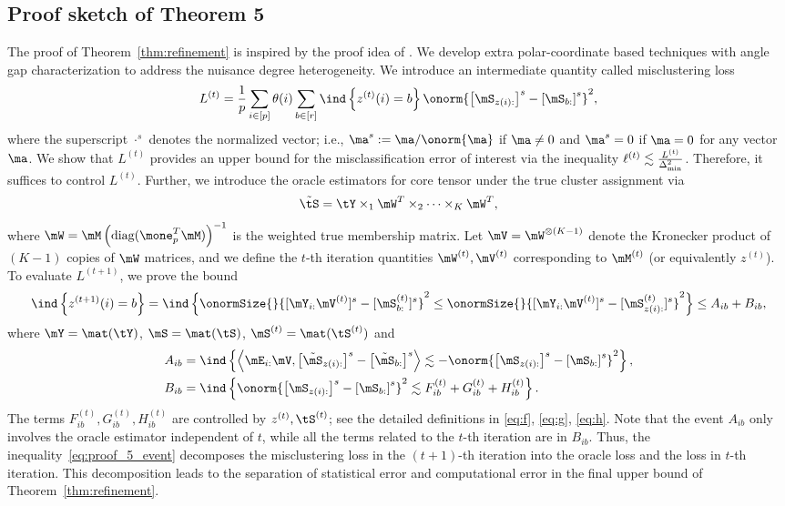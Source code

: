 \documentclass[lettersize,onecolumn,journal]{IEEEtran}
\theoremstyle{definition}
\theoremstyle{definition}
\newcommand{\of}[1]{\left(#1\right)}
\newcommand{\off}[1]{\left[#1\right]}
\newcommand{\offf}[1]{\left\{#1\right\}}
\newcommand{\ang}[1]{\left\langle#1\right\rangle}
\begin{document}
\subsection{Proof sketch of Theorem 5}
The proof of Theorem~\ref{thm:refinement} is inspired by the proof idea of \citet[Theorem 2]{han2020exact}. We develop extra polar-coordinate based techniques with angle gap characterization to address the nuisance degree heterogeneity. We introduce an intermediate quantity called misclustering loss
\begin{equation}
     L^{(t)} = \frac{1}{p}  \sum_{i \in [p]} \theta(i) \sum_{b \in [r]}  \ind \offf{ z^{(t)}(i) = b } \onorm{ \off{ \mS_{ z(i):}  }^s - \off{ \mS_{b:}  }^s  }^2,
\end{equation}
where the superscript $\cdot^{s}$ denotes the normalized vector; i.e., $\ma^s:=\ma/\onorm{\ma}$ if $\ma\neq 0$ and $\ma^{s}=0$ if $\ma=0$ for any vector $\ma$. We show that $L^{(t)}$ provides an upper bound for the misclassification error of interest via the inequality $\ell^{(t)}\lesssim {L^{(t)}\over \Delta^2_{\min}}$. Therefore, it suffices to control $L^{(t)}$. Further, we introduce the oracle estimators for core tensor under the true cluster assignment via 
\begin{equation}
    \tilde \tS = \tY \times_1 \mW^T \times_2 \cdots \times_K \mW^T, 
\end{equation}
where $\mW = \mM \of{ \text{diag}(\mone_{p}^T \mM) }^{-1}$ is the weighted true membership matrix. Let $ \mV = \mW^{\otimes (K-1)}$ denote the Kronecker product of $(K-1)$ copies of $\mW$ matrices, and we define the $t$-th iteration quantities $\mW^{(t)}, \mV^{(t)}$ corresponding to $\mM^{(t)}$ (or equivalently $z^{(t)}$). To evaluate $L^{(t+1)}$, we prove the bound
\begin{equation}\label{eq:proof_5_event}
    \ind \offf{ z^{(t+1)}(i) = b } = \ind \offf{       \onormSize{}{ [ \mY_{i:} \mV^{(t)}  ]^s - [\mS_{b:}^{(t)}]^s }^2 \leq \onormSize{}{ [ \mY_{i:} \mV^{(t)}  ]^s - [\mS_{z(i):}^{(t)}]^s }^2} \leq A_{ib} + B_{ib},
\end{equation}
where $\mY = \mat(\tY)$, $ \mS = \mat(\tS)$, $\mS^{(t)} = \mat(\tS^{(t)})$ and
\begin{align}
        A_{ib} &= \ind \offf{\ang{ \mE_{i:} \mV, \off{  \tilde \mS_{z(i):} }^s - \off{  \tilde \mS_{b:} }^s } \lesssim -  \onorm{ \off{ \mS_{z(i):}  }^s - \off{ \mS_{b:}  }^s  }^2 },\\
        B_{ib} &= \ind \offf{\onorm{ \off{ \mS_{z(i):}  }^s - \off{ \mS_{b:}  }^s  }^2 \lesssim F_{ib}^{(t)} + G_{ib}^{(t)} + H_{ib}^{(t)} }.
\end{align}
The terms $F_{ib}^{(t)}, G_{ib}^{(t)}, H_{ib}^{(t)}$ are controlled by $z^{(t)}, \tS^{(t)}$; see the detailed definitions in \eqref{eq:f}, \eqref{eq:g}, \eqref{eq:h}. Note that the event $A_{ib}$ only involves the oracle estimator independent of $t$, while all the terms related to the $t$-th iteration are in $B_{ib}$. Thus, the inequality~\eqref{eq:proof_5_event} decomposes the misclustering loss in the $(t+1)$-th iteration into the oracle loss and the loss in $t$-th iteration. This decomposition leads to the separation of statistical error and computational error in the final upper bound of Theorem~\ref{thm:refinement}.
\end{document}
